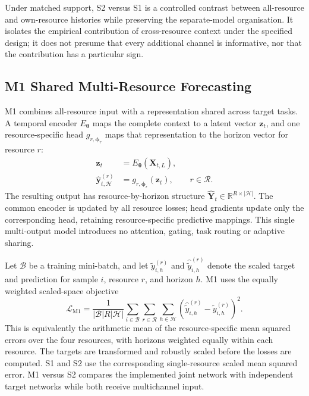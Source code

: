 \documentclass[a4paper,fleqn]{cas-dc}
\begin{document}
Under matched support, S2 versus S1 is a controlled contrast between
all-resource and own-resource histories while preserving the separate-model
organisation. It isolates the empirical contribution of cross-resource
context under the specified design; it does not presume that every additional
channel is informative, nor that the contribution has a particular sign.

\subsection{M1 Shared Multi-Resource Forecasting}
\label{sec:m1}

M1 combines all-resource input with a representation shared across target
tasks. A temporal encoder $E_{\boldsymbol{\theta}}$ maps the complete context
to a latent vector $\mathbf{z}_t$, and one resource-specific head
$g_{r,\boldsymbol{\phi}_r}$ maps that representation to the horizon vector for
resource $r$:
\begin{equation}
  \begin{aligned}
    \mathbf{z}_t
      &= E_{\boldsymbol{\theta}}(\mathbf{X}_{t,L}), \\
    \widehat{\mathbf{y}}_{t,\mathcal{H}}^{(r)}
      &= g_{r,\boldsymbol{\phi}_r}(\mathbf{z}_t),
      && r\in\mathcal{R}.
  \end{aligned}
  \label{eq:m1-forecast}
\end{equation}
The resulting output has resource-by-horizon structure
$\widehat{\mathbf{Y}}_{t}\in\mathbb{R}^{R\times|\mathcal{H}|}$.
The common encoder is updated by all resource losses; head gradients update
only the corresponding head, retaining resource-specific predictive mappings.
This single multi-output model introduces no attention, gating, task routing
or adaptive sharing.

Let $\mathcal{B}$ be a training mini-batch, and let
$\widetilde{y}_{i,h}^{(r)}$ and
$\widehat{\widetilde{y}}_{i,h}^{(r)}$ denote the scaled target and prediction
for sample $i$, resource $r$, and horizon $h$. M1 uses the equally weighted
scaled-space objective
\begin{equation}
  \mathcal{L}_{\mathrm{M1}}
  = \frac{1}{|\mathcal{B}|R|\mathcal{H}|}
    \sum_{i\in\mathcal{B}}
    \sum_{r\in\mathcal{R}}
    \sum_{h\in\mathcal{H}}
    \left(
      \widehat{\widetilde{y}}_{i,h}^{(r)}
      - \widetilde{y}_{i,h}^{(r)}
    \right)^2.
  \label{eq:m1-loss}
\end{equation}
This is equivalently the arithmetic mean of the resource-specific mean squared
errors over the four resources, with horizons weighted equally within each
resource. The targets are transformed and robustly scaled before the losses
are computed. S1 and S2 use the corresponding single-resource scaled mean
squared error. M1 versus S2 compares the implemented joint network with
independent target networks while both receive multichannel input.
\end{document}

